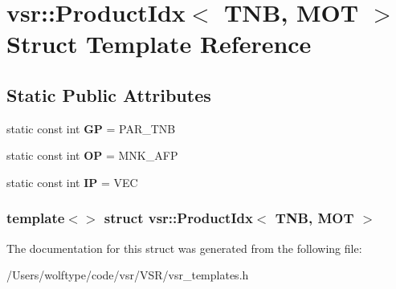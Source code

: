 \hypertarget{structvsr_1_1_product_idx_3_01_t_n_b_00_01_m_o_t_01_4}{\section{vsr\-:\-:Product\-Idx$<$ T\-N\-B, M\-O\-T $>$ Struct Template Reference}
\label{structvsr_1_1_product_idx_3_01_t_n_b_00_01_m_o_t_01_4}
}
\subsection*{Static Public Attributes}
\begin{DoxyCompactItemize}
\item 
\hypertarget{structvsr_1_1_product_idx_3_01_t_n_b_00_01_m_o_t_01_4_ad708b54ccd0875e40119cfb02464b892}{static const int {\bfseries G\-P} = P\-A\-R\-\_\-\-T\-N\-B}\label{structvsr_1_1_product_idx_3_01_t_n_b_00_01_m_o_t_01_4_ad708b54ccd0875e40119cfb02464b892}

\item 
\hypertarget{structvsr_1_1_product_idx_3_01_t_n_b_00_01_m_o_t_01_4_ab05c8cc58cae7b1a97bdbd2be98e1031}{static const int {\bfseries O\-P} = M\-N\-K\-\_\-\-A\-F\-P}\label{structvsr_1_1_product_idx_3_01_t_n_b_00_01_m_o_t_01_4_ab05c8cc58cae7b1a97bdbd2be98e1031}

\item 
\hypertarget{structvsr_1_1_product_idx_3_01_t_n_b_00_01_m_o_t_01_4_a155edf75590530c98b0bf9b39a512e60}{static const int {\bfseries I\-P} = V\-E\-C}\label{structvsr_1_1_product_idx_3_01_t_n_b_00_01_m_o_t_01_4_a155edf75590530c98b0bf9b39a512e60}

\end{DoxyCompactItemize}
\subsubsection*{template$<$$>$ struct vsr\-::\-Product\-Idx$<$ T\-N\-B, M\-O\-T $>$}



The documentation for this struct was generated from the following file\-:\begin{DoxyCompactItemize}
\item 
/\-Users/wolftype/code/vsr/\-V\-S\-R/vsr\-\_\-templates.\-h\end{DoxyCompactItemize}
